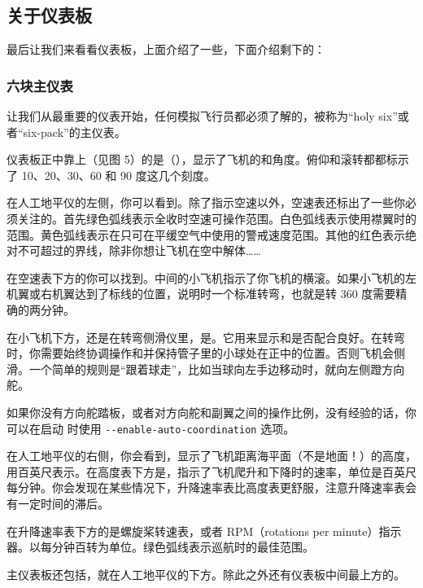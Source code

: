 \subsection{关于仪表板}

最后让我们来看看仪表板，上面介绍了一些，下面介绍剩下的：

\subsubsection{六块主仪表}

让我们从最重要的仪表开始，任何模拟飞行员都必须了解的，被称为“holy six”或者“six-pack”的主仪表。

仪表板正中靠上（见图 5）的是（），显示了飞机的和角度。俯仰和滚转都都标示了 10、20、30、60 和 90 度这几个刻度。

在人工地平仪的左侧，你可以看到。除了指示空速以外，空速表还标出了一些你必须关注的。首先绿色弧线表示全收时空速可操作范围。白色弧线表示使用襟翼时的范围。黄色弧线表示在只可在平缓空气中使用的警戒速度范围。其他的红色表示绝对不可超过的界线，除非你想让飞机在空中解体……

在空速表下方的你可以找到。中间的小飞机指示了你飞机的横滚。如果小飞机的左机翼或右机翼达到了标线的位置，说明时一个标准转弯，也就是转 360 度需要精确的两分钟。

在小飞机下方，还是在转弯侧滑仪里，是。它用来显示和是否配合良好。在转弯时，你需要始终协调操作和并保持管子里的小球处在正中的位置。否则飞机会侧滑。一个简单的规则是“跟着球走”，比如当球向左手边移动时，就向左侧蹬方向舵。
\medskip

如果你没有方向舵踏板，或者对方向舵和副翼之间的操作比例，没有经验的话，你可以在启动 \FlightGear{} 时使用 \texttt{-$ $-enable-auto-coordination} 选项。

在人工地平仪的右侧，你会看到，显示了飞机距离海平面（不是地面！）的高度，用百英尺表示。在高度表下方是，指示了飞机爬升和下降时的速率，单位是百英尺每分钟。你会发现在某些情况下，升降速率表比高度表更舒服，注意升降速率表会有一定时间的滞后。

在升降速率表下方的是螺旋桨转速表，或者 RPM（rotations per minute）指示器。以每分钟百转为单位。绿色弧线表示巡航时的最佳范围。

主仪表板还包括，就在人工地平仪的下方。除此之外还有仪表板中间最上方的。

